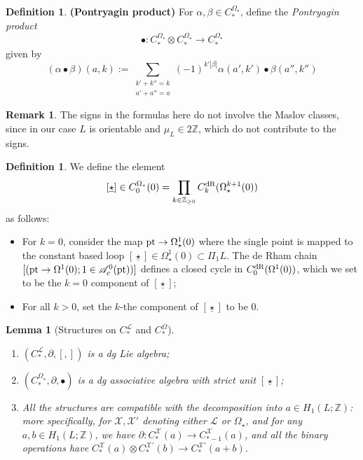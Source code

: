 \documentclass[10pt]{amsart}
\numberwithin{equation}{section}
\theoremstyle{plain}
\newtheorem{lemma}[theorem]{Lemma}
\theoremstyle{definition}
\newtheorem{definition}[theorem]{Definition}
\newtheorem{remark}[theorem]{Remark}
\theoremstyle{remark}
\numberwithin{equation}{section}
\newcommand{\Z}{\mathbb{Z}}
\newcommand{\dR}{\textup{dR}}
\newcommand{\pt}{\textup{pt}}
\newcommand{\CFr}{C_*^\mathscr{L}}
\newcommand{\CBa}{C_*^{\Omega_\star}}
\newcommand{\Cba}[1]{C_{#1}^{\Omega_\star}}
\begin{document}
{\begin{definition}
\textbf{{(Pontryagin product)}}
 For  $\alpha,\beta \in \CBa$, define the \emph{Pontryagin product} 
\[
	\bullet\colon \CBa \otimes \CBa \to \CBa
\]
given by
\begin{equation}\label{Eq: PontryaginProd}
	(\alpha \bullet \beta)(a,k) := \sum_{\substack{k'+k''=k\\a'+a''=a}} (-1)^{k'|\beta|}\alpha(a',k')\bullet \beta(a'',k'')
\end{equation}
\end{definition}


\begin{remark}
	The signs in the formulas here do not involve the Maslov classes, since in our case $L$ is orientable and $\mu_L\in 2\Z$, which do not contribute to the signs.
\end{remark}

\begin{definition}\label{Defn: CBaUnit}
	We define the element \[ [\underline{\star}] \in \Cba{0}(0) = \prod_{k\in \Z_{\geq 0}}C^\dR_k(\Omega_\star^{k+1}(0))\]as follows:
  \begin{itemize}
  	\item For $k=0$, consider the map $\pt\to \Omega^1_\star(0)$ where the single point is mapped to the constant based loop $[\underline{\star}]\in \Omega^1_\star(0)\subset \Pi_1 L$. The de Rham chain $[(\pt\to \Omega^1(0); 1\in \mathscr{A}^0_c(\pt))]$ defines a closed cycle in $C^\dR_0(\Omega^1(0))$, which we set to be the $k=0$ component of $[\underline{\star}]$;
  	\item For all $k>0$, set the $k$-the component of $[\underline{\star}]$ to be $0$.
  \end{itemize}
\end{definition}



\begin{lemma}
	[Structures on $C_*^\mathscr{L}$ and $C_*^\Omega$]\label{Lm: StructuresOnStates}
	\begin{enumerate}
		\item $(\CFr, \partial, [,])$ is a dg Lie algebra;
		\item $(\CBa, \partial, \bullet)$ is a dg associative algebra with strict unit $[\underline{\star}]$; 
		\item All the structures are compatible with the decomposition into $a\in H_1(L;\Z)$: more specifically, for $\mathcal{X},\mathcal{X}'$ denoting either $\mathscr{L}$ or $\Omega_\star$, and for any $a,b\in H_1(L;\Z)$, we  have $\partial\colon C_*^\mathcal{X}(a)\to C_{*-1}^\mathcal{X}(a)$, and all the binary operations have $C_*^\mathcal{X}(a)\otimes C_*^{\mathcal{X}'}(b)\to C_*^{\mathcal{X}'}(a+b)$.
	\end{enumerate}
\end{lemma}

}
\end{document}
